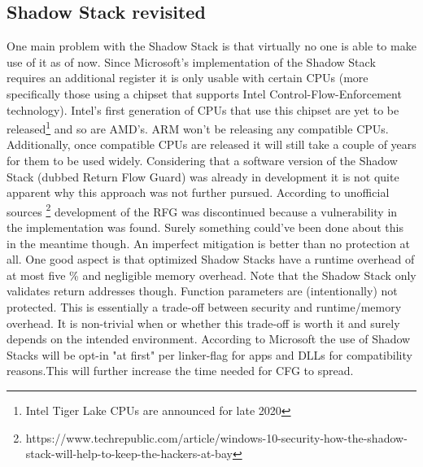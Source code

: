 \documentclass[10pt,twocolumn,a4paper]{article}
\begin{document}
\subsection{Shadow Stack revisited}
One main problem with the Shadow Stack is that virtually no one is able to make use of it as of now. Since Microsoft's implementation of the Shadow Stack requires an additional register it is only usable with certain CPUs (more specifically those using a chipset that supports Intel Control-Flow-Enforcement technology).
Intel's first generation of CPUs that use this chipset are yet to be released\footnote{Intel Tiger Lake CPUs are announced for late 2020} and so are AMD's.
ARM won't be releasing any compatible CPUs\cite{techrepublic}.
Additionally, once compatible CPUs are released it will still take a couple of years for them to be used widely.
Considering that a software version of the Shadow Stack (dubbed Return Flow Guard) was already in development it is not quite apparent why this approach was not further pursued.
According to unofficial sources \footnote{https://www.techrepublic.com/article/windows-10-security-how-the-shadow-stack-will-help-to-keep-the-hackers-at-bay} development of the RFG was discontinued because a vulnerability in the implementation was found. Surely something could've been done about this in the meantime though. An imperfect mitigation is better than no protection at all.
One good aspect is that optimized Shadow Stacks have a runtime overhead of at most five \% and negligible memory overhead.
Note that the Shadow Stack only validates return addresses though. Function parameters are (intentionally) not protected. This is essentially a trade-off between security and runtime/memory overhead. It is non-trivial when or whether this trade-off is worth it and surely depends on the intended environment.
According to Microsoft the use of Shadow Stacks will be opt-in "at first" per linker-flag for apps and DLLs for compatibility reasons.This will further increase the time needed for CFG to spread.
\end{document}
